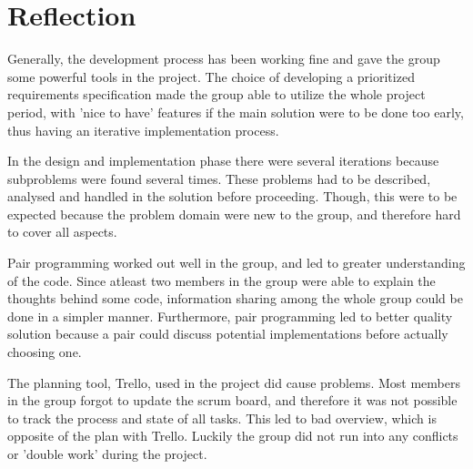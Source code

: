 
\section{Reflection}
Generally, the development process has been working fine and gave the group some powerful tools in the project. The choice of developing a prioritized requirements specification made the group able to utilize the whole project period, with 'nice to have' features if the main solution were to be done too early, thus having an iterative implementation process.

In the design and implementation phase there were several iterations because subproblems were found several times. These problems had to be described, analysed and handled in the solution before proceeding. Though, this were to be expected because the problem domain were new to the group, and therefore hard to cover all aspects.

Pair programming worked out well in the group, and led to greater understanding of the code. Since atleast two members in the group were able to explain the thoughts behind some code, information sharing among the whole group could be done in a simpler manner. Furthermore, pair programming led to better quality solution because a pair could discuss potential implementations before actually choosing one.

The planning tool, Trello, used in the project did cause problems. Most members in the group forgot to update the scrum board, and therefore it was not possible to track the process and state of all tasks. This led to bad overview, which is opposite of the plan with Trello. Luckily the group did not run into any conflicts or 'double work' during the project.

